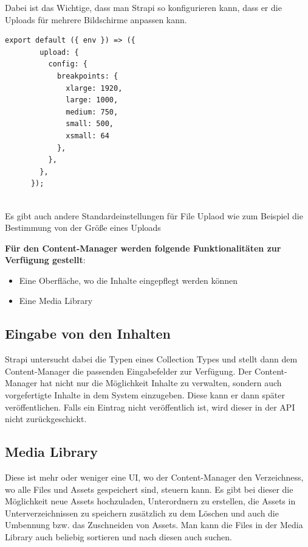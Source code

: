 Dabei ist das Wichtige, dass man Strapi so konfigurieren kann, dass er die Uploads für mehrere Bildschirme anpassen kann.
\begin{lstlisting}[caption=file upload config in strapi]
    export default ({ env }) => ({
        upload: {
          config: {
            breakpoints: {
              xlarge: 1920,
              large: 1000,
              medium: 750,
              small: 500,
              xsmall: 64
            },
          },
        },
      });
    
\end{lstlisting}
Es gibt auch andere Standardeinstellungen für File Uplaod wie zum Beispiel die Bestimmung von der Größe eines Uploads
\cite{upload}


\textbf{Für den Content-Manager werden folgende Funktionalitäten zur Verfügung gestellt}:
\begin{itemize}
  \item Eine Oberfläche, wo die Inhalte eingepflegt werden können
  \item Eine Media Library
\end{itemize}


\subsection{Eingabe von den Inhalten}
Strapi untersucht dabei die Typen eines Collection Types und stellt dann dem Content-Manager die passenden Eingabefelder zur Verfügung. Der Content-Manager hat nicht nur die Möglichkeit Inhalte zu verwalten, sondern auch vorgefertigte Inhalte in dem System einzugeben. Diese kann er dann später veröffentlichen. Falls ein Eintrag nicht veröffentlich ist, wird dieser in der API nicht zurückgeschickt.

\subsection{Media Library}

Diese ist mehr oder weniger eine UI, wo der Content-Manager den Verzeichness, wo alle Files und Assets gespeichert sind, steuern kann.
Es gibt bei dieser die Möglichkeit neue Assets hochzuladen, Unterordnern zu erstellen, die Assets in Unterverzeichnissen zu speichern zusätzlich zu dem Löschen und auch die Umbennung bzw. das Zuschneiden von Assets.
Man kann die Files in der Media Library auch beliebig sortieren und nach diesen auch suchen.
\cite{media-library}

